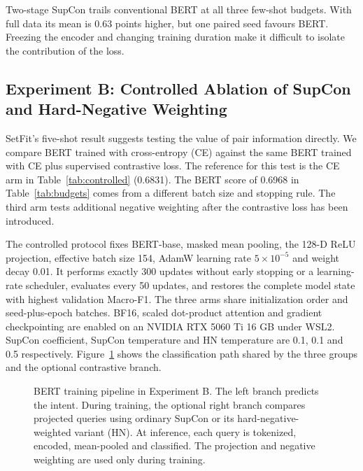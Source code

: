 \documentclass[runningheads]{llncs}
\begin{document}
Two-stage SupCon trails conventional BERT at all three few-shot budgets. With full data its mean is 0.63 points higher, but one paired seed favours BERT. Freezing the encoder and changing training duration make it difficult to isolate the contribution of the loss.

\subsection{Experiment B: Controlled Ablation of SupCon and Hard-Negative Weighting}
SetFit's five-shot result suggests testing the value of pair information directly. We compare BERT trained with cross-entropy (CE) against the same BERT trained with CE plus supervised contrastive loss. The reference for this test is the CE arm in Table~\ref{tab:controlled} (0.6831). The BERT score of 0.6968 in Table~\ref{tab:budgets} comes from a different batch size and stopping rule. The third arm tests additional negative weighting after the contrastive loss has been introduced.

The controlled protocol fixes BERT-base, masked mean pooling, the 128-D ReLU projection, effective batch size 154, AdamW learning rate $5\times10^{-5}$ and weight decay 0.01. It performs exactly 300 updates without early stopping or a learning-rate scheduler, evaluates every 50 updates, and restores the complete model state with highest validation Macro-F1. The three arms share initialization order and seed-plus-epoch batches. BF16, scaled dot-product attention and gradient checkpointing are enabled on an NVIDIA RTX 5060 Ti 16 GB under WSL2. SupCon coefficient, SupCon temperature and HN temperature are 0.1, 0.1 and 0.5 respectively. Figure~\ref{fig:pipeline} shows the classification path shared by the three groups and the optional contrastive branch.

\begin{figure}[htbp]
\centering
\scalebox{0.91}{}
\caption{BERT training pipeline in Experiment B. The left branch predicts the intent. During training, the optional right branch compares projected queries using ordinary SupCon or its hard-negative-weighted variant (HN). At inference, each query is tokenized, encoded, mean-pooled and classified. The projection and negative weighting are used only during training.}
\label{fig:pipeline}
\end{figure}

\begin{table}[tb]
\caption{Controlled 5-shot comparison, three seeds. Time includes training and periodic validation; throughput is warm test inference, including loading batches and returning scores but excluding tokenization and model loading. Memory is peak PyTorch allocated memory.}
\label{tab:controlled}\centering

\end{table}
\end{document}
